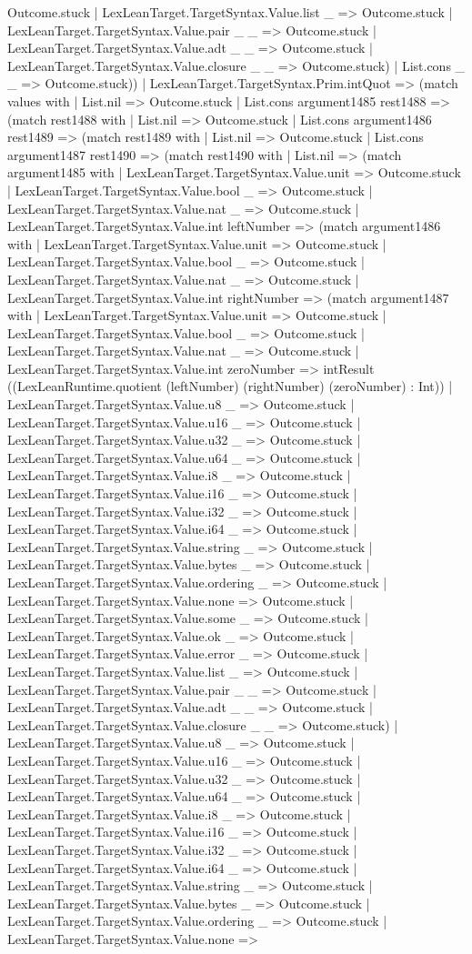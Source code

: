 \documentclass[11pt]{article}
\begin{document}
Outcome.stuck | LexLeanTarget.TargetSyntax.Value.list \_ => Outcome.stuck | LexLeanTarget.TargetSyntax.Value.pair \_ \_ => Outcome.stuck | LexLeanTarget.TargetSyntax.Value.adt \_ \_ => Outcome.stuck | LexLeanTarget.TargetSyntax.Value.closure \_ \_ => Outcome.stuck) | List.cons \_ \_ => Outcome.stuck)) | LexLeanTarget.TargetSyntax.Prim.intQuot => (match values with | List.nil => Outcome.stuck | List.cons argument1485 rest1488 => (match rest1488 with | List.nil => Outcome.stuck | List.cons argument1486 rest1489 => (match rest1489 with | List.nil => Outcome.stuck | List.cons argument1487 rest1490 => (match rest1490 with | List.nil => (match argument1485 with | LexLeanTarget.TargetSyntax.Value.unit => Outcome.stuck | LexLeanTarget.TargetSyntax.Value.bool \_ => Outcome.stuck | LexLeanTarget.TargetSyntax.Value.nat \_ => Outcome.stuck | LexLeanTarget.TargetSyntax.Value.int leftNumber => (match argument1486 with | LexLeanTarget.TargetSyntax.Value.unit => Outcome.stuck | LexLeanTarget.TargetSyntax.Value.bool \_ => Outcome.stuck | LexLeanTarget.TargetSyntax.Value.nat \_ => Outcome.stuck | LexLeanTarget.TargetSyntax.Value.int rightNumber => (match argument1487 with | LexLeanTarget.TargetSyntax.Value.unit => Outcome.stuck | LexLeanTarget.TargetSyntax.Value.bool \_ => Outcome.stuck | LexLeanTarget.TargetSyntax.Value.nat \_ => Outcome.stuck | LexLeanTarget.TargetSyntax.Value.int zeroNumber => intResult ((LexLeanRuntime.quotient (leftNumber) (rightNumber) (zeroNumber) : Int)) | LexLeanTarget.TargetSyntax.Value.u8 \_ => Outcome.stuck | LexLeanTarget.TargetSyntax.Value.u16 \_ => Outcome.stuck | LexLeanTarget.TargetSyntax.Value.u32 \_ => Outcome.stuck | LexLeanTarget.TargetSyntax.Value.u64 \_ => Outcome.stuck | LexLeanTarget.TargetSyntax.Value.i8 \_ => Outcome.stuck | LexLeanTarget.TargetSyntax.Value.i16 \_ => Outcome.stuck | LexLeanTarget.TargetSyntax.Value.i32 \_ => Outcome.stuck | LexLeanTarget.TargetSyntax.Value.i64 \_ => Outcome.stuck | LexLeanTarget.TargetSyntax.Value.string \_ => Outcome.stuck | LexLeanTarget.TargetSyntax.Value.bytes \_ => Outcome.stuck | LexLeanTarget.TargetSyntax.Value.ordering \_ => Outcome.stuck | LexLeanTarget.TargetSyntax.Value.none => Outcome.stuck | LexLeanTarget.TargetSyntax.Value.some \_ => Outcome.stuck | LexLeanTarget.TargetSyntax.Value.ok \_ => Outcome.stuck | LexLeanTarget.TargetSyntax.Value.error \_ => Outcome.stuck | LexLeanTarget.TargetSyntax.Value.list \_ => Outcome.stuck | LexLeanTarget.TargetSyntax.Value.pair \_ \_ => Outcome.stuck | LexLeanTarget.TargetSyntax.Value.adt \_ \_ => Outcome.stuck | LexLeanTarget.TargetSyntax.Value.closure \_ \_ => Outcome.stuck) | LexLeanTarget.TargetSyntax.Value.u8 \_ => Outcome.stuck | LexLeanTarget.TargetSyntax.Value.u16 \_ => Outcome.stuck | LexLeanTarget.TargetSyntax.Value.u32 \_ => Outcome.stuck | LexLeanTarget.TargetSyntax.Value.u64 \_ => Outcome.stuck | LexLeanTarget.TargetSyntax.Value.i8 \_ => Outcome.stuck | LexLeanTarget.TargetSyntax.Value.i16 \_ => Outcome.stuck | LexLeanTarget.TargetSyntax.Value.i32 \_ => Outcome.stuck | LexLeanTarget.TargetSyntax.Value.i64 \_ => Outcome.stuck | LexLeanTarget.TargetSyntax.Value.string \_ => Outcome.stuck | LexLeanTarget.TargetSyntax.Value.bytes \_ => Outcome.stuck | LexLeanTarget.TargetSyntax.Value.ordering \_ => Outcome.stuck | LexLeanTarget.TargetSyntax.Value.none => 
\end{document}
